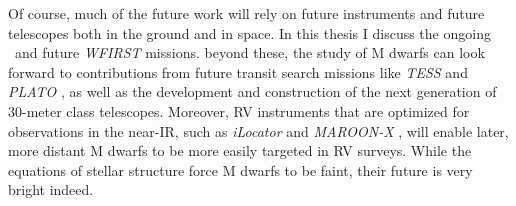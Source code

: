 Of course, much of the future work will rely on future instruments and future telescopes
both in the ground and in space. 
In this thesis I discuss the ongoing \KT\ and future \textit{WFIRST} missions.
beyond these, the study of M dwarfs can look forward to contributions from future 
transit search missions like \textit{TESS} \citep{Ricker14} and \textit{PLATO} \citep{Catala10}, as well as the 
development and construction of the next generation of 30-meter class telescopes.
Moreover, RV instruments that are optimized for observations in the near-IR, such as
\textit{iLocator} \citep{Crepp14} and \textit{MAROON-X} \citep{Seifahrt16}, will enable
later, more distant M dwarfs to be more easily targeted in RV surveys.
While the equations of stellar structure force M dwarfs to be faint, their future
is very bright indeed.